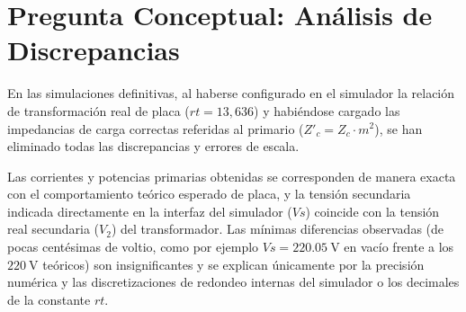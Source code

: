 \section{Pregunta Conceptual: Análisis de Discrepancias}

En las simulaciones definitivas, al haberse configurado en el simulador la relación de transformación real de placa
($rt = 13,636$) y habiéndose cargado las impedancias de carga correctas referidas al primario ($Z'_c = Z_c \cdot m^2$),
se han eliminado todas las discrepancias y errores de escala.

Las corrientes y potencias primarias obtenidas se corresponden de manera exacta con el comportamiento teórico esperado
de placa, y la tensión secundaria indicada directamente en la interfaz del simulador ($Vs$) coincide con la tensión real
secundaria ($V_2$) del transformador. Las mínimas diferencias observadas (de pocas centésimas de voltio, como por ejemplo
$Vs = \SI{220,05}{\volt}$ en vacío frente a los $\SI{220}{\volt}$ teóricos) son insignificantes y se explican únicamente
por la precisión numérica y las discretizaciones de redondeo internas del simulador o los decimales de la constante $rt$.


